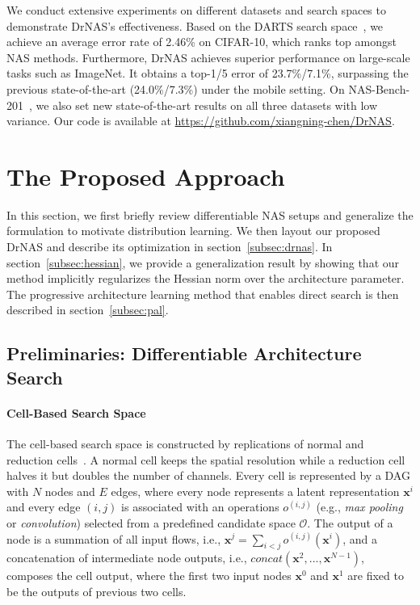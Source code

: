 \documentclass{article} \usepackage{iclr2021_conference,times}
\begin{document}
We conduct extensive experiments on different datasets and search spaces to demonstrate DrNAS's effectiveness. Based on the DARTS search space~\citep{darts}, we achieve an average error rate of 2.46\% on CIFAR-10, which ranks top amongst NAS methods.
Furthermore, DrNAS achieves superior performance on large-scale tasks such as ImageNet. It obtains a top-1/5 error of 23.7\%/7.1\%, surpassing the previous state-of-the-art (24.0\%/7.3\%) under the mobile setting.
On NAS-Bench-201~\citep{nasbench201}, we also set new state-of-the-art results on all three datasets with low variance.
Our code is available at \url{https://github.com/xiangning-chen/DrNAS}.


\section{The Proposed Approach}
In this section, we first briefly review differentiable NAS setups and generalize the formulation to motivate distribution learning.
We then layout our proposed DrNAS and describe its optimization in section~\ref{subsec:drnas}.
In section~\ref{subsec:hessian}, we provide a generalization result by showing that our method implicitly regularizes the Hessian norm over the architecture parameter.
The progressive architecture learning method that enables direct search is then described in section~\ref{subsec:pal}.

\subsection{Preliminaries: Differentiable Architecture Search}
\paragraph{Cell-Based Search Space}
The cell-based search space is constructed by replications of normal and reduction cells~\citep{nasnet,darts}.
A normal cell keeps the spatial resolution while a reduction cell halves it but doubles the number of channels.
Every cell is represented by a DAG with $N$ nodes and $E$ edges, where every node represents a latent representation $\textbf{x}^i$ and every edge $(i,j)$ is associated with an operations $o^{(i,j)}$ (e.g., \textit{max pooling} or \textit{convolution}) selected from a predefined candidate space $\mathcal{O}$.
The output of a node is a summation of all input flows, i.e., $\textbf{x}^j=\sum_{i<j}o^{(i,j)}(\textbf{x}^i)$, and a concatenation of intermediate node outputs, i.e., $concat(\textbf{x}^2,...,\textbf{x}^{N-1})$, composes the cell output, where the first two input nodes $\textbf{x}^0$ and $\textbf{x}^1$ are fixed to be the outputs of previous two cells.
\end{document}
